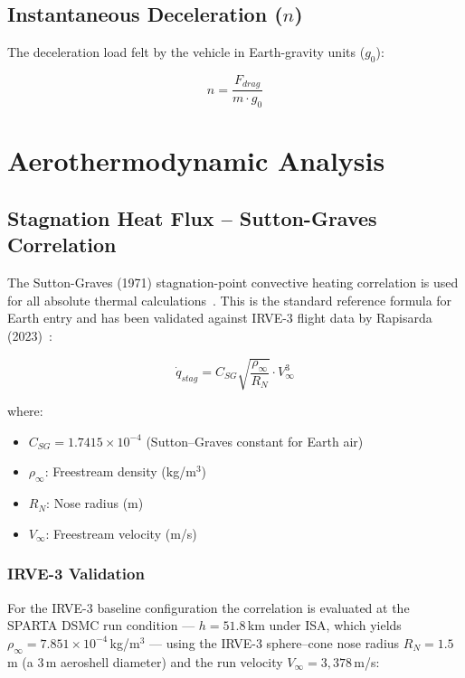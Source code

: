\subsection{Instantaneous Deceleration (\texorpdfstring{$n$}{n})}
The deceleration load felt by the vehicle in Earth-gravity units ($g_0$):

\begin{equation}
    n = \frac{F_{drag}}{m \cdot g_0}
\end{equation}

\section{Aerothermodynamic Analysis}

\subsection{Stagnation Heat Flux -- Sutton-Graves Correlation}
The Sutton-Graves (1971) stagnation-point convective heating correlation is used for all absolute thermal calculations~\cite{sutton1971gravesh}. This is the standard reference formula for Earth entry and has been validated against IRVE-3 flight data by Rapisarda (2023)~\cite{rapisarda2023mdao}:

\begin{equation}
    \boxed{\dot{q}_{stag} = C_{SG} \sqrt{\frac{\rho_{\infty}}{R_N}} \cdot V_{\infty}^3}
\end{equation}

where:
\begin{itemize}
    \item $C_{SG} = 1.7415 \times 10^{-4}$ (Sutton--Graves constant for Earth air)

    \item $\rho_{\infty}$: Freestream density (kg/m$^3$)

    \item $R_N$: Nose radius (m)

    \item $V_{\infty}$: Freestream velocity (m/s)
\end{itemize}

\subsubsection*{IRVE-3 Validation}
For the IRVE-3 baseline configuration the correlation is evaluated at the SPARTA DSMC run condition --- $h = 51.8$\,km under ISA, which yields $\rho_{\infty} = 7.851 \times 10^{-4}$\,kg/m$^3$ --- using the IRVE-3 sphere--cone nose radius $R_N = 1.5$\,m (a 3\,m aeroshell diameter) and the run velocity $V_{\infty} = 3{,}378$\,m/s:

